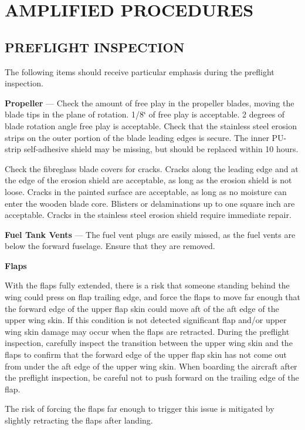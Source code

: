 \cleardoublepage


\cleardoublepage


\section{AMPLIFIED PROCEDURES}

\subsection{PREFLIGHT INSPECTION}
The following items should receive particular emphasis during the preflight inspection.

\textbf{Propeller} --- Check the amount of free play in the propeller blades, moving the blade tips in the plane of rotation. 1/8\char`\"{} of free play is acceptable. 2 degrees of blade rotation angle free play is acceptable. Check that the stainless steel erosion strips on the outer portion of the blade leading edges is secure. The inner PU-strip self-adhesive shield may be missing, but should be replaced within 10 hours.

Check the fibreglass blade covers for cracks. Cracks along the leading edge and at the edge of the erosion shield are acceptable, as long as the erosion shield is not loose. Cracks in the painted surface are acceptable, as long as no moisture can enter the wooden blade core. Blisters or delaminations up to one square inch are acceptable. Cracks in the stainless steel erosion shield require immediate repair.

\textbf{Fuel Tank Vents} --- The fuel vent plugs are easily missed, as the fuel vents are below the forward fuselage. Ensure that they are removed.

\textbf{Flaps}
\begin{Note}[CAUTION]
With the flaps fully extended, there is a risk that someone standing behind the wing could press on flap trailing edge, and force the flaps to move far enough that the forward edge of the upper flap skin could move aft of the aft edge of the upper wing skin. If this condition is not detected significant flap and/or upper wing skin damage may occur when the flaps are retracted. During the preflight inspection, carefully inspect the transition between the upper wing skin and the flaps to confirm that the forward edge of the upper flap skin has not come out from under the aft edge of the upper wing skin. When boarding the aircraft after the preflight inspection, be careful not to push forward on the trailing edge of the flap. 

The risk of forcing the flaps far enough to trigger this issue is mitigated by slightly retracting the flaps after landing.
\end{Note}



